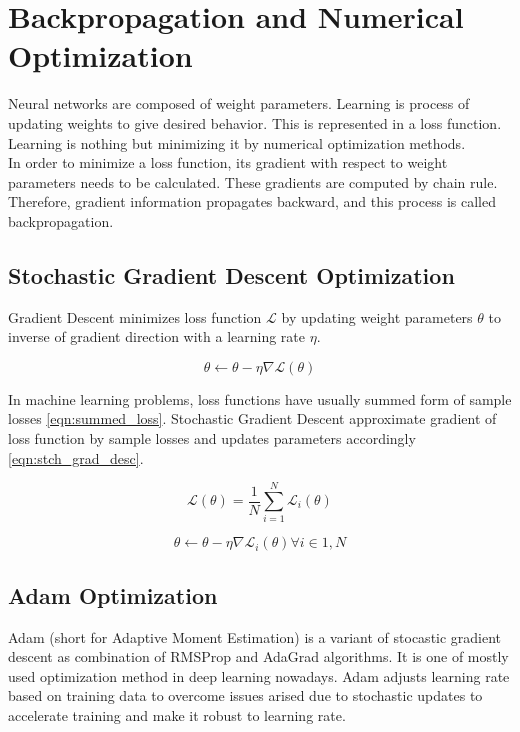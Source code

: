 \section{Backpropagation and Numerical Optimization}
Neural networks are composed of weight parameters. Learning is process of updating weights to give desired behavior. This is represented in a loss function. Learning is nothing but minimizing it by numerical optimization methods. \\

In order to minimize a loss function, its gradient with respect to weight parameters needs to be calculated. These gradients are computed by chain rule. Therefore, gradient information propagates backward, and this process is called backpropagation. 

\subsection{Stochastic Gradient Descent Optimization}

Gradient Descent minimizes loss function $\mathcal{L}$ by updating weight parameters $\theta$ to inverse of gradient direction with a learning rate $\eta$. 

\begin{equation}
\label{eq: grad_desc}
\theta \leftarrow \theta - \eta \nabla \mathcal{L}(\theta)
\end{equation}

In machine learning problems, loss functions have usually summed form of sample losses \eqref{eqn:summed_loss}. Stochastic Gradient Descent approximate gradient of loss function by sample losses and updates parameters accordingly \eqref{eqn:stch_grad_desc}. 

\begin{equation}
\label{eqn:summed_loss}
\mathcal{L}(\theta) = \frac{1}{N} \sum_{i=1}^{N} \mathcal{L}_i(\theta)
\end{equation}

\begin{equation}
\label{eqn:stch_grad_desc}
\theta \leftarrow \theta - \eta \nabla \mathcal{L}_i(\theta) \forall i \in {1,N}
\end{equation}

\subsection{Adam Optimization}

Adam \cite{kingma_adam_2017}  (short for Adaptive Moment Estimation) is a variant of stocastic gradient descent as combination of RMSProp \cite{hinton_lecture_nodate} and AdaGrad \cite{duchi_adaptive_2011} algorithms. It is one of mostly used optimization method in deep learning nowadays. Adam adjusts learning rate based on training data to overcome issues arised due to stochastic updates to accelerate training and make it robust to learning rate. \\





